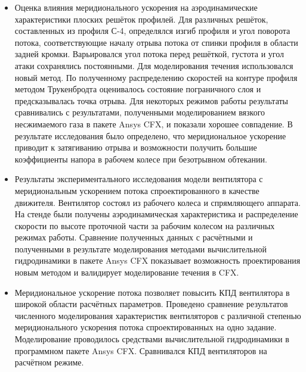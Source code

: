 \begin{itemize}[beginpenalty=10000]
	\item 
	Оценка влияния меридионального ускорения на аэродинамические характеристики плоских решёток профилей. Для различных решёток, составленных из профиля С-4, определялся изгиб профиля и угол поворота потока, соответствующие началу отрыва потока от спинки профиля в области задней кромки. Варьировался угол потока перед решёткой, густота и угол атаки сохранялись постоянными. Для моделирования течения использовался новый метод. По полученному распределению скоростей на контуре профиля методом Трукенбродта оценивалось состояние пограничного слоя и предсказывалась точка отрыва. Для некоторых режимов работы результаты сравнивались с результатами, полученными моделированием вязкого несжимаемого газа в пакете Ansys CFX, и показали хорошее совпадение. В результате исследования было определено, что меридиональное ускорение приводит к затягиванию отрыва и возможности получить большие коэффициенты напора в рабочем колесе при безотрывном обтекании.
	
	\item 
	Результаты экспериментального исследования модели вентилятора с меридиональным ускорением потока спроектированного в качестве движителя. Вентилятор состоял из рабочего колеса и спрямляющего аппарата. На стенде были получены аэродинамическая характеристика и распределение скорости по высоте проточной части за рабочим колесом на различных режимах работы. Сравнение полученных данных с расчётными и полученными в результате моделирования методами вычислительной гидродинамики в пакете Ansys CFX показывает возможность проектирования новым методом и валидирует моделирование течения в CFX.
	
	\item 
	Меридиональное ускорение потока позволяет повысить КПД вентилятора в широкой области расчётных параметров. Проведено сравнение результатов численного моделирования характеристик вентиляторов с различной степенью меридионального ускорения потока спроектированных на одно задание. Моделирование проводилось средствами вычислительной гидродинамики в программном пакете Ansys CFX. Сравнивался КПД вентиляторов на расчётном режиме.
\end{itemize}

